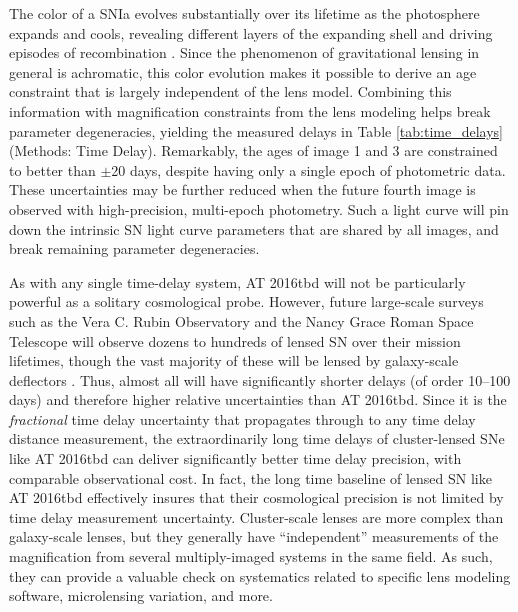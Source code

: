 \documentclass[12pt]{article}
\def\SNABC{AT 2016tbd\xspace}
\begin{document}
The color of a SNIa evolves substantially over its lifetime as the photosphere expands and cools, revealing different layers of the expanding shell and driving episodes of recombination \cite{kasen_type_2009}. %
Since the phenomenon of gravitational lensing in general is achromatic, this color evolution makes it possible to derive an age constraint that is largely independent of the lens model. %
Combining this information with magnification constraints from the lens modeling helps break parameter degeneracies, yielding the measured delays in Table \ref{tab:time_delays}
(Methods: Time Delay).
Remarkably, the ages of image 1 and 3 are constrained to better than $\pm$20 days, despite having only a single epoch of photometric data.    These uncertainties may be 
further reduced when the future fourth image is observed with high-precision, multi-epoch photometry.  Such a light curve will pin down the intrinsic SN light curve parameters that are shared by all images, and break remaining parameter degeneracies.

As with any single time-delay system, \SNABC will not be particularly powerful as a solitary cosmological probe.  However, future large-scale surveys such as the Vera C. Rubin Observatory 
and the Nancy Grace Roman Space Telescope will observe dozens to hundreds of lensed SN over their mission lifetimes, though the vast majority of these will be lensed by galaxy-scale deflectors \cite{oguri_gravitationally_2010,  goldstein_rates_2019, pierel_projected_2020}. %
 Thus, almost all will have significantly shorter 
delays (of order 10--100 days) and therefore higher relative uncertainties than \SNABC.  Since it is the {\it fractional} time delay uncertainty that 
propagates through to any time delay distance measurement, the extraordinarily long time delays of cluster-lensed SNe like \SNABC can deliver significantly better time delay precision, with comparable observational cost.  In fact, the long time baseline of lensed SN like \SNABC effectively insures that their cosmological precision is not limited by time delay measurement uncertainty. 
Cluster-scale lenses are more complex than galaxy-scale lenses, but they generally have ``independent'' measurements of the magnification from several multiply-imaged systems in the same field. As such, they can provide a valuable check on systematics related to specific lens modeling software, microlensing variation, and more. 
\end{document}
